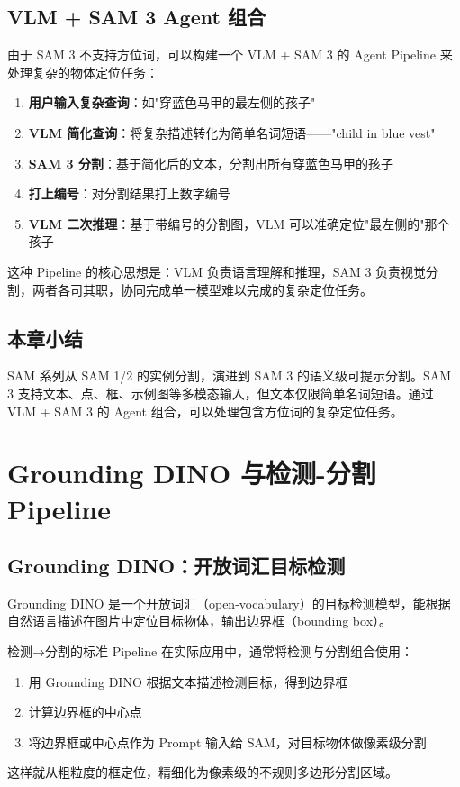 \documentclass[a4paper]{article}
\begin{document}
\subsection{VLM + SAM 3 Agent 组合}

由于 SAM 3 不支持方位词，可以构建一个 VLM + SAM 3 的 Agent Pipeline 来处理复杂的物体定位任务：

\begin{enumerate}
    \item \textbf{用户输入复杂查询}：如"穿蓝色马甲的最左侧的孩子"
    \item \textbf{VLM 简化查询}：将复杂描述转化为简单名词短语——"child in blue vest"
    \item \textbf{SAM 3 分割}：基于简化后的文本，分割出所有穿蓝色马甲的孩子
    \item \textbf{打上编号}：对分割结果打上数字编号
    \item \textbf{VLM 二次推理}：基于带编号的分割图，VLM 可以准确定位"最左侧的"那个孩子
\end{enumerate}

这种 Pipeline 的核心思想是：VLM 负责语言理解和推理，SAM 3 负责视觉分割，两者各司其职，协同完成单一模型难以完成的复杂定位任务。

\subsection{本章小结}

SAM 系列从 SAM 1/2 的实例分割，演进到 SAM 3 的语义级可提示分割。SAM 3 支持文本、点、框、示例图等多模态输入，但文本仅限简单名词短语。通过 VLM + SAM 3 的 Agent 组合，可以处理包含方位词的复杂定位任务。


\section{Grounding DINO 与检测-分割 Pipeline}

\subsection{Grounding DINO：开放词汇目标检测}

Grounding DINO 是一个开放词汇（open-vocabulary）的目标检测模型，能根据自然语言描述在图片中定位目标物体，输出边界框（bounding box）。

\begin{importantbox}{检测→分割的标准 Pipeline}
在实际应用中，通常将检测与分割组合使用：
\begin{enumerate}
    \item 用 Grounding DINO 根据文本描述检测目标，得到边界框
    \item 计算边界框的中心点
    \item 将边界框或中心点作为 Prompt 输入给 SAM，对目标物体做像素级分割
\end{enumerate}
这样就从粗粒度的框定位，精细化为像素级的不规则多边形分割区域。
\end{importantbox}
\end{document}
